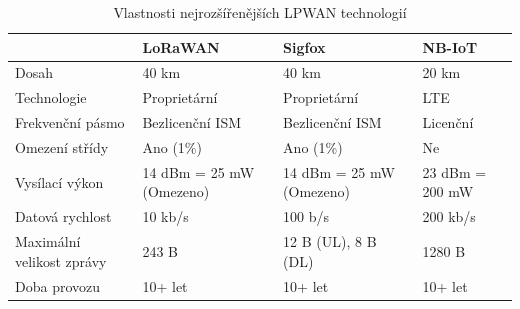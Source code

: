 \begin{table}[!h]
\caption[Vlastnosti LPWAN technologií]{Vlastnosti nejrozšířenějších LPWAN technologií \cite{J76NlDAVQuEhT6co, B5fEKVY7u8J8dyUq, Stusek2019}}
\label{table:rozděleníLPWAN}
\begin{center}
\small
\begin{tabular}{|p{3cm}|p{3cm}|p{3cm}|p{3cm}|}
\hline
& \acs{LoRaWAN} & Sigfox & \acs{NB-IoT}\\
\hline \hline
Dosah & 40 km & 40 km & 20 km\\
\hline
Technologie & Proprietární & Proprietární & \acs{LTE}\\
\hline
Frekvenční pásmo & Bezlicenční \acs{ISM} & Bezlicenční \acs{ISM} & Licenční\\
\hline
Omezení střídy & Ano (1\%) & Ano (1\%) & Ne\\
\hline
Vysílací výkon & 14 dBm = 25 mW (Omezeno) & 14 dBm = 25 mW (Omezeno) & 23 dBm = 200 mW\\
\hline
Datová rychlost & 10 kb/s & 100 b/s & 200 kb/s\\
\hline
Maximální velikost zprávy & 243 B & 12 B (\acs{UL}), 8 B (\acs{DL}) & 1280 B\\
\hline
Doba provozu & 10+ let & 10+ let & 10+ let\\
\hline
\end{tabular}
\end{center}
\end{table}


